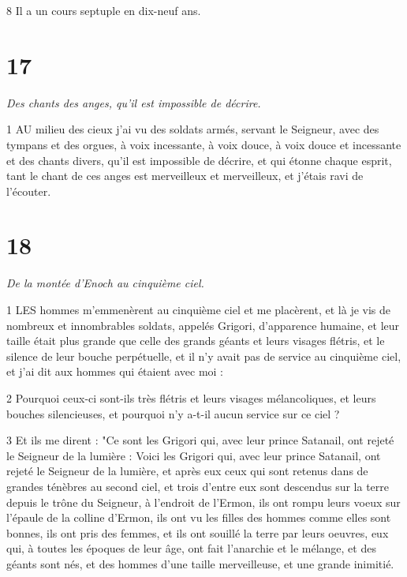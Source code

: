\par 8 Il a un cours septuple en dix-neuf ans.

\chapter{17}

\par \textit{Des chants des anges, qu'il est impossible de décrire.}

\par 1 AU milieu des cieux j'ai vu des soldats armés, servant le Seigneur, avec des tympans et des orgues, à voix incessante, à voix douce, à voix douce et incessante et des chants divers, qu'il est impossible de décrire, et qui étonne chaque esprit, tant le chant de ces anges est merveilleux et merveilleux, et j'étais ravi de l'écouter.

\chapter{18}

\par \textit{De la montée d'Enoch au cinquième ciel.}

\par 1 LES hommes m'emmenèrent au cinquième ciel et me placèrent, et là je vis de nombreux et innombrables soldats, appelés Grigori, d'apparence humaine, et leur taille était plus grande que celle des grands géants et leurs visages flétris, et le silence de leur bouche perpétuelle, et il n'y avait pas de service au cinquième ciel, et j'ai dit aux hommes qui étaient avec moi :

\par 2 Pourquoi ceux-ci sont-ils très flétris et leurs visages mélancoliques, et leurs bouches silencieuses, et pourquoi n'y a-t-il aucun service sur ce ciel ?

\par 3 Et ils me dirent : "Ce sont les Grigori qui, avec leur prince Satanail, ont rejeté le Seigneur de la lumière : Voici les Grigori qui, avec leur prince Satanail, ont rejeté le Seigneur de la lumière, et après eux ceux qui sont retenus dans de grandes ténèbres au second ciel, et trois d'entre eux sont descendus sur la terre depuis le trône du Seigneur, à l'endroit de l'Ermon, ils ont rompu leurs voeux sur l'épaule de la colline d'Ermon, ils ont vu les filles des hommes comme elles sont bonnes, ils ont pris des femmes, et ils ont souillé la terre par leurs oeuvres, eux qui, à toutes les époques de leur âge, ont fait l'anarchie et le mélange, et des géants sont nés, et des hommes d'une taille merveilleuse, et une grande inimitié.

